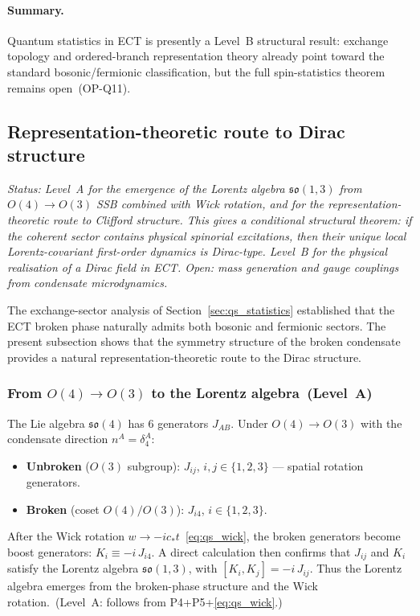 \paragraph{Summary.}
Quantum statistics in ECT is presently a Level~B structural result:
exchange topology and ordered-branch representation theory already
point toward the standard bosonic/fermionic classification, but the
full spin-statistics theorem remains open~(OP-Q11).

\subsection{Representation-theoretic route to Dirac structure}
\label{sec:qs_dirac}

\textit{Status: Level~A for the emergence of the Lorentz algebra
$\mathfrak{so}(1,3)$ from $O(4)\to O(3)$ SSB combined with Wick
rotation, and for the representation-theoretic route to Clifford
structure.
This gives a conditional structural theorem: if the coherent sector
contains physical spinorial excitations, then their unique local
Lorentz-covariant first-order dynamics is Dirac-type.
Level~B for the physical realisation of a Dirac field in ECT.
Open: mass generation and gauge couplings from condensate microdynamics.}

\medskip
The exchange-sector analysis of Section~\ref{sec:qs_statistics}
established that the ECT broken phase naturally admits both bosonic
and fermionic sectors.
The present subsection shows that the symmetry structure of the broken
condensate provides a natural representation-theoretic route to
the Dirac structure.

\subsubsection*{From $O(4)\to O(3)$ to the Lorentz algebra~(Level~A)}

The Lie algebra $\mathfrak{so}(4)$ has 6 generators $J_{AB}$.
Under $O(4)\to O(3)$ with the condensate direction $n^A=\delta^A_4$:
\begin{itemize}
  \item \textbf{Unbroken} ($O(3)$ subgroup): $J_{ij}$,
    $i,j\in\{1,2,3\}$ --- spatial rotation generators.
  \item \textbf{Broken} (coset $O(4)/O(3)$): $J_{i4}$,
    $i\in\{1,2,3\}$.
\end{itemize}
After the Wick rotation $w\to-ic_*t$~\eqref{eq:qs_wick},
the broken generators become boost generators:
$K_i\equiv-i\,J_{i4}$.
A direct calculation then confirms that $J_{ij}$ and $K_i$ satisfy
the Lorentz algebra $\mathfrak{so}(1,3)$,
with $[K_i,K_j]=-i\,J_{ij}$.
Thus the Lorentz algebra emerges from the broken-phase structure
and the Wick rotation.~(Level~A: follows from P4+P5+\eqref{eq:qs_wick}.)

